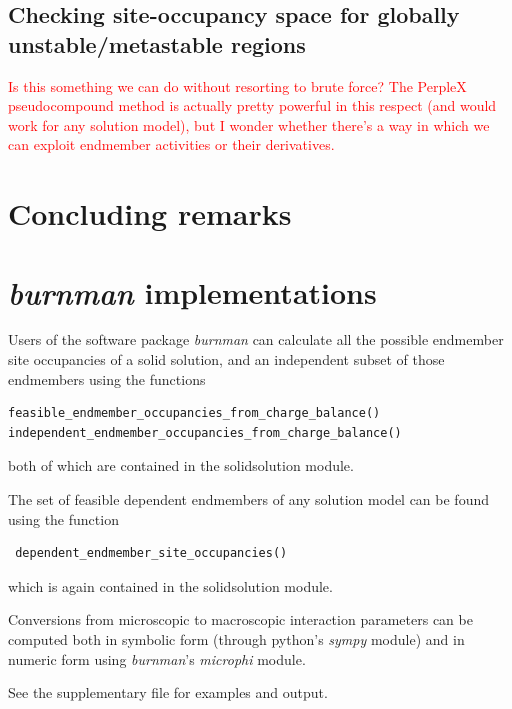 \documentclass[preprint,12pt]{elsarticle}
\begin{document}
\subsection{Checking site-occupancy space for globally unstable/metastable regions}
\textcolor{red}{Is this something we can do without resorting to brute force? The PerpleX pseudocompound method is actually pretty powerful in this respect (and would work for any solution model), but I wonder whether there's a way in which we can exploit endmember activities or their derivatives.}

\section{Concluding remarks}




\appendix
\section{\emph{burnman} implementations}
Users of the software package \emph{burnman} can calculate all the possible endmember site occupancies of a solid solution, and an independent subset of those endmembers using the functions
\begin{verbatim}
feasible_endmember_occupancies_from_charge_balance()
independent_endmember_occupancies_from_charge_balance()
\end{verbatim}
both of which are contained in the solidsolution module. 

The set of feasible dependent endmembers of any solution model can be found using the function
 \begin{verbatim}
 dependent_endmember_site_occupancies()
 \end{verbatim}
which is again contained in the solidsolution module. 

Conversions from microscopic to macroscopic interaction parameters can be computed both in symbolic form (through python's \emph{sympy} module) and in numeric form using \emph{burnman}'s \emph{microphi} module. 

See the supplementary file for examples and output. 

\end{document}
